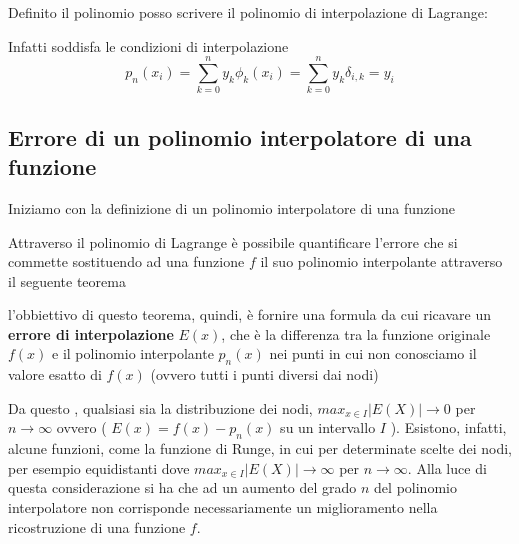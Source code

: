 Definito il polinomio posso scrivere il polinomio di interpolazione di Lagrange:

Infatti soddisfa le condizioni di interpolazione
\[
    p_n(x_i)= \sum_{k=0}^n y_k\phi_k(x_i) = \sum_{k=0}^n y_k\delta_{i,k} = y_i
\]
\subsection{Errore di un polinomio interpolatore di una funzione}

Iniziamo con la definizione di un polinomio interpolatore di una funzione


Attraverso il polinomio di Lagrange è possibile quantificare l'errore che si commette sostituendo ad una funzione $f$ il suo polinomio interpolante attraverso il seguente teorema


l'obbiettivo di questo teorema, quindi, è fornire una formula da cui ricavare un \textbf{errore di interpolazione} $E(x)$, che è la differenza tra la funzione originale $f(x)$ e il polinomio interpolante $p_n(x)$ nei punti in cui non conosciamo il valore esatto di $f(x)$ (ovvero tutti i punti diversi dai nodi)

Da questo , qualsiasi sia la distribuzione dei
nodi, $max_{x\in I}|E(X)|\to 0$ per $n\to\infty$ ovvero ( $E(x)=f(x)-p_n(x)$ su un intervallo $I$ ). Esistono, infatti, alcune funzioni, come la funzione di
Runge, in cui per determinate scelte dei nodi, per esempio equidistanti dove  $max_{x\in I}|E(X)|\to \infty$ per $n\to\infty$. Alla luce di questa considerazione si ha che ad un aumento del grado $n$ del polinomio interpolatore non corrisponde necessariamente un miglioramento nella ricostruzione di una funzione $f$.

